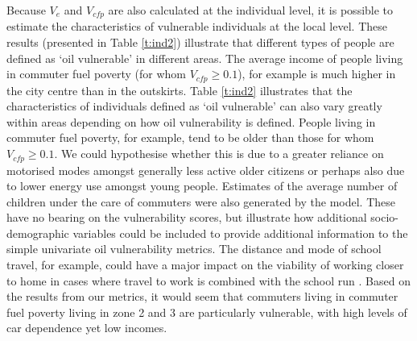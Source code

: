 Because $V_e$ and $V_{cfp}$ are also calculated at the individual level,
it is possible to estimate the characteristics of vulnerable individuals
at the local level. These results (presented in Table \ref{t:ind2})
illustrate that different types of people are defined as `oil vulnerable'
in different areas. The average income of people living in commuter fuel
poverty (for whom $V_{cfp} \geq 0.1$), for example is much higher in the
city centre than in the outskirts. Table \ref{t:ind2} illustrates that
the characteristics of individuals defined as `oil vulnerable' can also
vary greatly within areas depending on how oil vulnerability is defined.
People living in commuter fuel poverty, for example, tend to be older
than those for whom $V_{cfp} \geq 0.1$. We could hypothesise
whether this is due to a greater reliance
on motorised modes amongst generally less active older citizens or
perhaps also due to lower energy use amongst young people.
Estimates of the average number of children
under the care of commuters were also generated by the model.
These have no bearing on the vulnerability scores, but
illustrate how additional socio-demographic variables could be included to
provide additional information to the simple univariate oil vulnerability
metrics. The distance and mode of school travel, for example, could have a
major impact on the viability of working closer to home in cases where
travel to work is combined with the school run \citep{Hensher2000-chaining}.
Based on the results
from our metrics, it would seem that commuters living in
commuter fuel poverty living in zone 2 and 3 are particularly vulnerable,
with high levels of car dependence yet low incomes.


